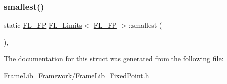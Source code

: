 \mbox{\label{struct_f_l___limits_3_01_f_l___f_p_01_4_abbe30add075e57d481380848b101b1d5}} 
\subsubsection{\texorpdfstring{smallest()}{smallest()}}
{\footnotesize\ttfamily static \hyperlink{class_f_l___f_p}{F\+L\+\_\+\+FP} \hyperlink{struct_f_l___limits}{F\+L\+\_\+\+Limits}$<$ \hyperlink{class_f_l___f_p}{F\+L\+\_\+\+FP} $>$\+::smallest (\begin{DoxyParamCaption}{ }\end{DoxyParamCaption})\hspace{0.3cm}{\ttfamily [inline]}, {\ttfamily [static]}}



The documentation for this struct was generated from the following file\+:\begin{DoxyCompactItemize}
\item 
Frame\+Lib\+\_\+\+Framework/\hyperlink{_frame_lib___fixed_point_8h}{Frame\+Lib\+\_\+\+Fixed\+Point.\+h}\end{DoxyCompactItemize}
